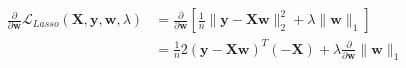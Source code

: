 \newcommand{\matrix}[1]{\mathbf{#1}}
\newcommand{\vector}[1]{\mathbf{#1}}
\newcommand{\X}{\matrix{X}}
\newcommand{\y}{\vector{y}}
\newcommand{\w}{\vector{w}}
\begin{align*}
\frac{\partial}{\partial \w} \mathcal{L}_{\textit{Lasso}} (\X,\y,\w,\lambda) &= \frac{\partial}{\partial \w} \left[ \frac{1}{n} \|\y - \X\w\|_2^2 + \lambda \|\w\|_1 \right] \\
&=  \frac{1}{n} 2 (\y - \X\w)^T(-\X) + \lambda \frac{\partial}{\partial \w} \|\w\|_1 \\
\end{align*}
